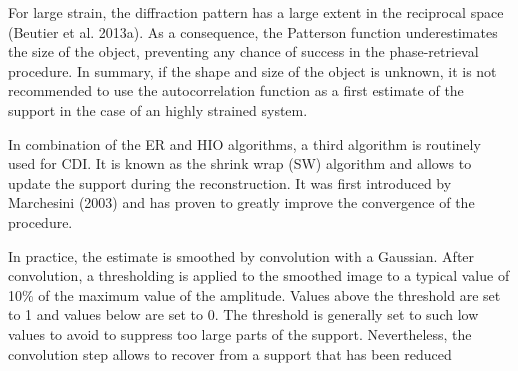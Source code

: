 For large strain, the diffraction pattern has a large extent in the reciprocal space
(Beutier et al. 2013a). As a consequence, the Patterson function underestimates the size of the object, preventing any chance of success in the phase-retrieval procedure. In summary, if the shape and size of the object is unknown, it is not recommended to use the autocorrelation function as a first estimate of the support in the case of an highly strained system.

In combination of the ER and HIO algorithms, a third algorithm is routinely used for CDI. It is known as the shrink wrap (SW) algorithm and allows to update the support during the reconstruction. It was first introduced by Marchesini (2003) and has proven to greatly improve the convergence of the procedure.

In practice, the estimate is smoothed by convolution with a Gaussian. After convolution, a thresholding is applied to the smoothed image to a typical value of 10\% of the maximum value of the amplitude. Values above the threshold are set to 1 and values below are set to 0. The threshold is generally set to such low values to avoid to suppress too large parts of the support. Nevertheless, the convolution step allows to recover from a support that has been reduced
